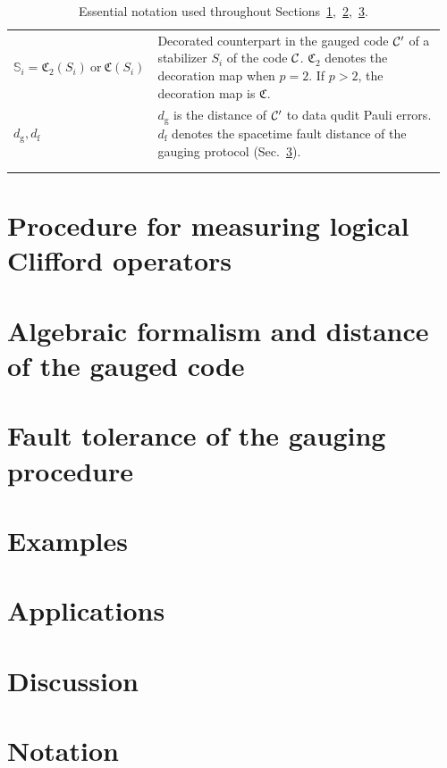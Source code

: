 \documentclass[aps,prx,onecolumn,nofootinbib,11pt,superscriptaddress]{revtex4-2}
\begin{document}
\begin{longtable}{p{0.25\linewidth}p{0.71\linewidth}}
        $\mathbb{S}_i = \mathfrak{C}_2(S_i) \mathrm{\ or\ }\mathfrak{C}(S_i)$ & Decorated counterpart in the gauged code $\mathcal{C}'$ of a stabilizer $S_i$ of the code $\mathcal{C}$. $\mathfrak{C}_2$ denotes the decoration map when $p=2$. If $p>2$, the decoration map is $\mathfrak{C}$.\\ 

        
        $d_\mathrm{g},d_\mathrm{f}$ & $d_\mathrm{g}$ is the distance of $\mathcal{C}'$ to data qudit Pauli errors. $d_\mathrm{f}$ denotes the spacetime fault distance of the gauging protocol (Sec.~\ref{sec:spacetime-distance}).\\
        \bottomrule
    \\
    \caption{Essential notation used throughout Sections~\ref{sec:gauging-procedure},~\ref{sec:space-distance},~\ref{sec:spacetime-distance}.}
    \label{tab:notation-lite}\\
\end{longtable}



\section{Procedure for measuring logical Clifford operators}\label{sec:gauging-procedure}


\section{Algebraic formalism and distance of the gauged code}\label{sec:space-distance}



\section{Fault tolerance of the gauging procedure}\label{sec:spacetime-distance}


\section{Examples} \label{sec:examples}



\section{Applications}\label{sec:applications}
 

\section{Discussion}









\appendix



\newpage


\clearpage 

\section{Notation}


\end{document}
